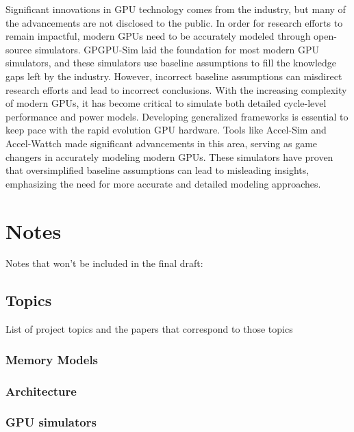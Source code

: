 \documentclass[conference]{IEEEtran}
\begin{document}
Significant innovations in GPU technology comes from the industry, but many of the advancements are not disclosed to the public.
In order for research efforts to remain impactful, modern GPUs need to be accurately modeled through open-source simulators.
GPGPU-Sim laid the foundation for most modern GPU simulators, and these simulators use baseline assumptions to fill the knowledge gaps left by the industry.
However, incorrect baseline assumptions can misdirect research efforts and lead to incorrect conclusions.
With the increasing complexity of modern GPUs, it has become critical to simulate both detailed cycle-level performance and power models.
Developing generalized frameworks is essential to keep pace with the rapid evolution GPU hardware.
Tools like Accel-Sim and Accel-Wattch made significant advancements in this area, serving as game changers in accurately modeling modern GPUs.
These simulators have proven that oversimplified baseline assumptions can lead to misleading insights, emphasizing the need for more accurate and detailed modeling approaches.

\clearpage
\appendix
\section{Notes}
Notes that won't be included in the final draft:
\subsection{Topics}
List of project topics and the papers that correspond to those topics
\subsubsection{Memory Models}
\cite{Bakhoda2009}
\cite{Ibrahim2020}
\cite{Singh2013}
\cite{Pratheek2023}
\cite{Mei2015}
\cite{Liu2018}
\cite{Fung2011ISM}
\cite{Jog2013OWL}
\cite{Kadam2018}
\cite{Liu2020}
\cite{Jog2013}
\subsubsection{Architecture}
\cite{Bakhoda2009}
\cite{Yan2022}
\cite{Hayes2019}
\cite{Sanudo2020}
\cite{Laguna2022}
\cite{Zhu2019}
\cite{Fung2011HPC}
\subsubsection{GPU simulators}
\cite{Khairy2020}
\cite{Kandiah2021}
\cite{Bakhoda2009}
\cite{Hayes2019}
\cite{Raihan2018}
\cite{Liu2020}
\cite{Jog2013}




\end{document}
